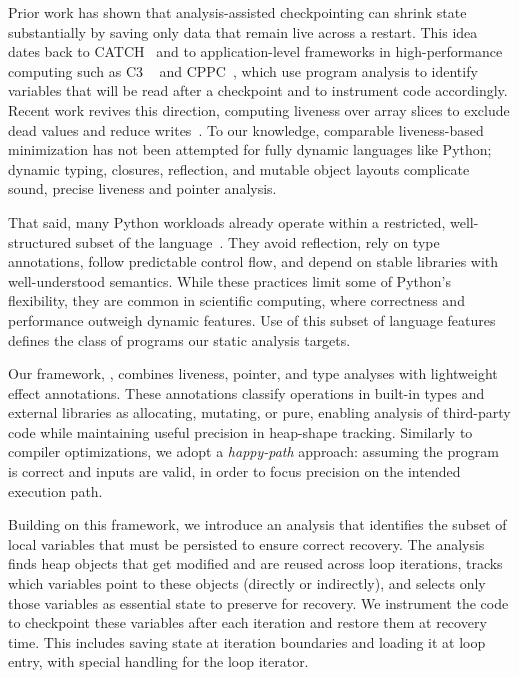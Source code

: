 Prior work has shown that analysis-assisted checkpointing can shrink state substantially by saving only data that remain live across a restart. This idea dates back to CATCH~\cite{li1990catch} and to application-level frameworks in high-performance computing such as C3 ~\cite{bronevetsky2004application} and CPPC~\cite{rodriguez2010cppc}, which use program analysis to identify variables that will be read after a checkpoint and to instrument code accordingly. Recent work revives this direction, computing liveness over array slices to exclude dead values and reduce writes~\cite{kim2024lact}. To our knowledge, comparable liveness-based minimization has not been attempted for fully dynamic languages like Python; dynamic typing, closures, reflection, and mutable object layouts complicate sound, precise liveness and pointer analysis.

That said, many Python workloads already operate within a restricted, well-structured subset of the language~\cite{bence2021unambiguity}. They avoid reflection, rely on type annotations, follow predictable control flow, and depend on stable libraries with well-understood semantics. While these practices limit some of Python's flexibility, they are common in scientific computing, where correctness and performance outweigh dynamic features. Use of this subset of language features defines the class of programs our static analysis targets.

Our framework, \spyte, combines liveness, pointer, and type analyses with lightweight effect annotations. These annotations classify operations in built-in types and external libraries as allocating, mutating, or pure, enabling analysis of third-party code while maintaining useful precision in heap-shape tracking. Similarly to compiler optimizations, we adopt a \emph{happy-path} approach: assuming the program is correct and inputs are valid, in order to focus precision on the intended execution path.

Building on this framework, we introduce an analysis that identifies the subset of local variables that must be persisted to ensure correct recovery. The analysis finds heap objects that get modified and are reused across loop iterations, tracks which variables point to these objects (directly or indirectly), and selects only those variables as essential state to preserve for recovery. We instrument the code to checkpoint these variables after each iteration and restore them at recovery time. This includes saving state at iteration boundaries and loading it at loop entry, with special handling for the loop iterator.

